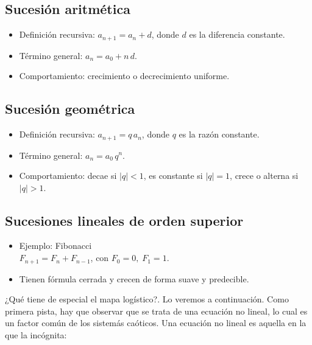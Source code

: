 \documentclass[
  10pt,
  a4paper,
  DIV=11,
  numbers=noendperiod,
  open=any]{scrreprt}
\providecommand{\tightlist}{%
  \setlength{\itemsep}{0pt}\setlength{\parskip}{0pt}}
\numberwithin{equation}{chapter}
\numberwithin{equation}{chapter}
\renewcommand{\[}{\begin{equation}}
\renewcommand{\]}{\end{equation}}
\begin{document}
\subsection{Sucesión aritmética}\label{sucesiuxf3n-aritmuxe9tica}

\begin{itemize}
\tightlist
\item
  Definición recursiva: \(a_{n+1} = a_n + d\), donde \(d\) es la
  diferencia constante.\\
\item
  Término general: \(a_n = a_0 + n\,d\).\\
\item
  Comportamiento: crecimiento o decrecimiento uniforme.
\end{itemize}

\subsection{Sucesión geométrica}\label{sucesiuxf3n-geomuxe9trica}

\begin{itemize}
\tightlist
\item
  Definición recursiva: \(a_{n+1} = q\,a_n\), donde \(q\) es la razón
  constante.\\
\item
  Término general: \(a_n = a_0\,q^n\).\\
\item
  Comportamiento: decae si \(|q|<1\), es constante si \(|q|=1\), crece o
  alterna si \(|q|>1\).
\end{itemize}

\subsection{Sucesiones lineales de orden
superior}\label{sucesiones-lineales-de-orden-superior}

\begin{itemize}
\tightlist
\item
  Ejemplo: Fibonacci\\
  \(F_{n+1} = F_n + F_{n-1}\), con \(F_0=0,\;F_1=1\).\\
\item
  Tienen fórmula cerrada y crecen de forma suave y predecible.
\end{itemize}

¿Qué tiene de especial el mapa logístico?. Lo veremos a continuación.
Como primera pista, hay que observar que se trata de una ecuación no
lineal, lo cual es un factor común de los sistemás caóticos. Una
ecuación no lineal es aquella en la que la incógnita:
\end{document}
